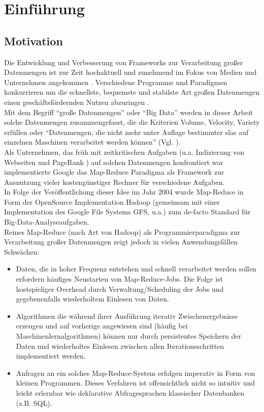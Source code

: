 \chapter{Einführung}

\section{Motivation}

Die Entwicklung und Verbesserung von Frameworks zur Verarbeitung großer Datenmengen ist zur Zeit hochaktuell und zunehmend im Fokus von Medien und Unternehmen angekommen \cite{Bit14}. Verschiedene Programme und Paradigmen konkurrieren um die schnellste, bequemste und stabilste Art großen Datenmengen einen geschäftsfördernden Nutzen abzuringen \cite{Sin14}.\\

Mit dem Begriff "`große Datenmengen"' oder "`Big Data"' werden in dieser Arbeit solche Datenmengen zusammengefasst, die die Kriterien Volume, Velocity, Variety \cite{Lan01} erfüllen oder "`Datenmengen, die nicht mehr unter Auflage bestimmter \gls{sla}s auf einzelnen Maschinen verarbeitet werden können"' (Vgl. \cite{Sam14}).\\

Als Unternehmen, das früh mit zeitkritischen Aufgaben (u.a.  Indizierung von Webseiten und PageRank \cite{page2001method}) auf solchen Datenmengen konfrontiert war implementierte Google das Map-Reduce Paradigma \cite{Dean04} als Framework zur Ausnutzung vieler kostengünstiger Rechner für verschiedene Aufgaben. \\

In Folge der Veröffentlichung dieser Idee im Jahr 2004 wurde Map-Reduce in Form der OpenSource Implementation Hadoop (gemeinsam mit einer Implementation des Google File Systems GFS, u.a.) \cite{Ghema03} zum de-facto Standard für Big-Data-Analyseaufgaben.\\

Reines Map-Reduce (nach Art von Hadoop) als Programmierparadigma zur Verarbeitung großer Datenmengen zeigt jedoch in vielen Anwendungsfällen Schwächen:
\begin{itemize}
	\item Daten, die in hoher Frequenz entstehen und schnell verarbeitet werden sollen erfordern häufiges Neustarten von Map-Reduce-Jobs. Die Folge ist kostspieliger Overhead durch Verwaltung/Scheduling der Jobs und gegebenenfalls wiederholtem Einlesen von Daten.
	\item Algorithmen die während ihrer Ausführung iterativ Zwischenergebnisse erzeugen und auf vorherige angewiesen sind (häufig bei Maschinenlernalgorithmen) können nur durch persistentes Speichern der Daten und wiederholtes Einlesen zwischen allen Iterationsschritten implementiert werden.
	\item Anfragen an ein solches Map-Reduce-System erfolgen imperativ in Form von kleinen Programmen. Dieses Verfahren ist offensichtlich nicht so intuitiv und leicht erlernbar wie deklarative Abfragesprachen klassischer Datenbanken (z.B. SQL).
\end{itemize}

